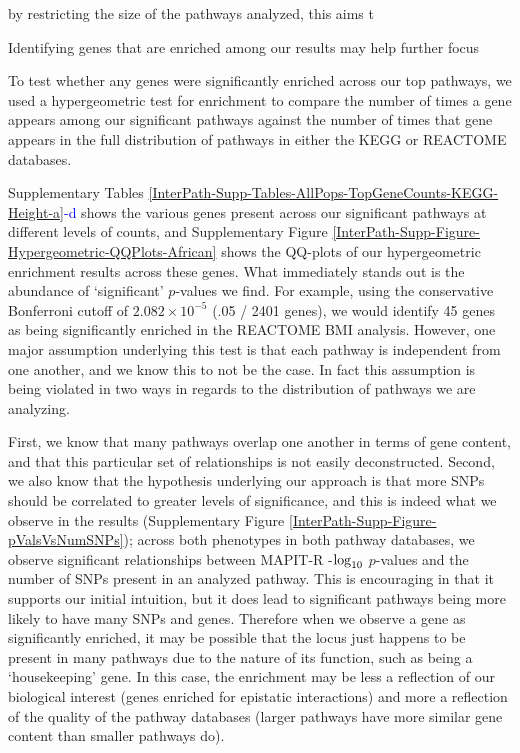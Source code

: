 \documentclass[12pt,a4paper]{article}
\def\log{{\rm log}}
\begin{document}
by restricting the size of the pathways analyzed, this aims t 

Identifying genes that are enriched among our results may help further focus  






To test whether any genes were significantly enriched across our top pathways, we used a hypergeometric test for enrichment to compare the number of times a gene appears among our significant pathways against the number of times that gene appears in the full distribution of pathways in either the KEGG or REACTOME databases. 

Supplementary Tables \ref{InterPath-Supp-Tables-AllPops-TopGeneCounts-KEGG-Height-a}\textcolor{blue}{-d} shows the various genes present across our significant pathways at different levels of counts, and Supplementary Figure \ref{InterPath-Supp-Figure-Hypergeometric-QQPlots-African} shows the QQ-plots of our hypergeometric enrichment results across these genes. What immediately stands out is the abundance of `significant' $p$-values we find. For example, using the conservative Bonferroni cutoff of $2.082\times10^{-5}$ (.05 / 2401 genes), we would identify 45 genes as being significantly enriched in the REACTOME BMI analysis. However, one major assumption underlying this test is that each pathway is independent from one another, and we know this to not be the case. In fact this assumption is being violated in two ways in regards to the distribution of pathways we are analyzing. 

First, we know that many pathways overlap one another in terms of gene content, and that this particular set of relationships is not easily deconstructed. Second, we also know that the hypothesis underlying our approach is that more SNPs should be correlated to greater levels of significance, and this is indeed what we observe in the results (Supplementary Figure \ref{InterPath-Supp-Figure-pValsVsNumSNPs}); across both phenotypes in both pathway databases, we observe significant relationships between MAPIT-R -$\log_{10}$ $p$-values and the number of SNPs present in an analyzed pathway. This is encouraging in that it supports our initial intuition, but it does lead to significant pathways being more likely to have many SNPs and genes. Therefore when we observe a gene as significantly enriched, it may be possible that the locus just happens to be present in many pathways due to the nature of its function, such as being a `housekeeping' gene. In this case, the enrichment may be less a reflection of our biological interest (genes enriched for epistatic interactions) and more a reflection of the quality of the pathway databases (larger pathways have more similar gene content than smaller pathways do).
\end{document}
